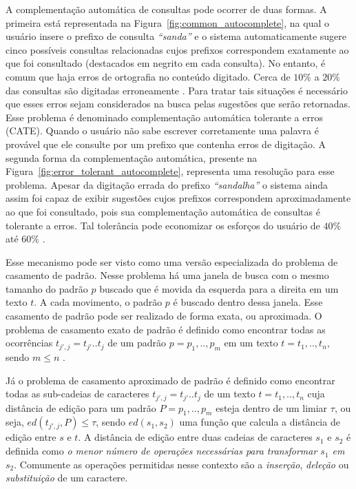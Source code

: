 A complementação automática de consultas pode ocorrer de duas formas. A primeira está representada na Figura~\ref{fig:common_autocomplete}, na qual o usuário insere o prefixo de consulta \textit{``sanda''} e o sistema automaticamente sugere cinco possíveis consultas relacionadas cujos prefixos correspondem exatamente ao que foi consultado (destacados em negrito em cada consulta). No entanto, é comum que haja erros de ortografia no conteúdo digitado. Cerca de $10\%$ a $20\%$ das consultas são digitadas erroneamente \citep{broder2009}. Para tratar tais situações é necessário que esses erros sejam considerados na busca pelas sugestões que serão retornadas. Esse problema é denominado complementação automática  tolerante a erros (CATE). Quando o usuário não sabe escrever corretamente uma palavra é provável que ele consulte por um prefixo que contenha erros de digitação. A segunda forma da complementação automática, presente na Figura~\ref{fig:error_tolerant_autocomplete}, representa uma resolução para esse problema. Apesar da digitação errada do prefixo \textit{``sandalha''} o sistema ainda assim foi capaz de exibir sugestões cujos prefixos correspondem aproximadamente ao que foi consultado, pois sua complementação automática de consultas é tolerante a erros. Tal tolerância pode economizar os esforços do usuário de $40\%$ até $60\%$ \citep{ji2009efficient}.

Esse mecanismo pode ser visto como uma versão especializada do problema de casamento de padrão. Nesse problema há uma janela de busca com o mesmo tamanho do padrão $p$ buscado que é movida da esquerda para a direita em um texto $t$. A cada movimento, o padrão $p$ é buscado dentro dessa janela. Esse casamento de padrão pode ser realizado de forma exata, ou aproximada. O problema de casamento exato de padrão é definido como encontrar todas as ocorrências $t_{j',j} = t_{j'}..t_{j}$ de um padrão $p = p_{1},..,p_{m}$ em um texto $t = t_{1},..,t_{n}$, sendo $m \leq n$ \citep{farostringmatching2013}.  

Já o problema de casamento aproximado de padrão é definido como encontrar todas as sub-cadeias de caracteres $t_{j',j} = t_{j'}..t_{j}$ de um texto $t = t_{1},..,t_{n}$ cuja distância de edição para um padrão $P = p_{1},..,p_{m}$ esteja dentro de um limiar $\tau$, ou seja, $ed(t_{j',j}, P) \leq \tau$, sendo $ed(s_{1}, s_{2})$ uma função que calcula a distância de edição entre $s$ e $t$. A distância de edição entre duas cadeias de caracteres $s_{1}$ e $s_{2}$ é definida como \textit{o menor número de operações necessárias para transformar $s_{1}$ em $s_{2}$}. Comumente as operações permitidas nesse contexto são a \textit{inserção}, \textit{deleção} ou \textit{substituição} de um caractere.

